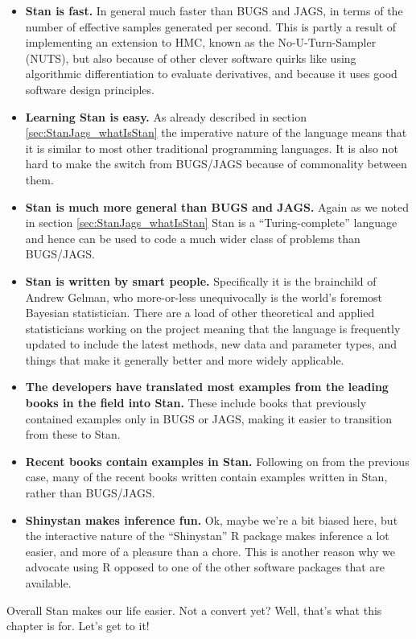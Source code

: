 \documentclass[11pt,fullpage]{book}
\begin{document}
\begin{itemize}
\item \textbf{Stan is fast.} In general much faster than BUGS and JAGS, in terms of the number of effective samples generated per second. This is partly a result of implementing an extension to HMC, known as the No-U-Turn-Sampler (NUTS), but also because of other clever software quirks like using algorithmic differentiation to evaluate derivatives, and because it uses good software design principles.
\item \textbf{Learning Stan is easy.} As already described in section \ref{sec:StanJags_whatIsStan} the imperative nature of the language means that it is similar to most other traditional programming languages. It is also not hard to make the switch from BUGS/JAGS because of commonality between them.
\item \textbf{Stan is much more general than BUGS and JAGS.} Again as we noted in section \ref{sec:StanJags_whatIsStan} Stan is a ``Turing-complete'' language and hence can be used to code a much wider class of problems than BUGS/JAGS.
\item \textbf{Stan is written by smart people.} Specifically it is the brainchild of Andrew Gelman, who more-or-less unequivocally is the world's foremost Bayesian statistician. There are a load of other theoretical and applied statisticians working on the project meaning that the language is frequently updated to include the latest methods, new data and parameter types, and things that make it generally better and more widely applicable.
\item \textbf{The developers have translated most examples from the leading books in the field into Stan.} These include books that previously contained examples only in BUGS or JAGS, making it easier to transition from these to Stan.
\item \textbf{Recent books contain examples in Stan.} Following on from the previous case, many of the recent books written contain examples written in Stan, rather than BUGS/JAGS.
\item \textbf{Shinystan makes inference fun.} Ok, maybe we're a bit biased here, but the interactive nature of the ``Shinystan'' R package makes inference a lot easier, and more of a pleasure than a chore. This is another reason why we advocate using R opposed to one of the other software packages that are available. 
\end{itemize}

Overall Stan makes our life easier. Not a convert yet? Well, that's what this chapter is for. Let's get to it!
\end{document}

